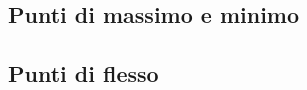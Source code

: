 \documentclass[a4paper]{article}
\begin{document}
		\subsection{Punti di massimo e minimo}
		\subsection{Punti di flesso}
	
	
	
	
	
	
	
	
	
	
	
	
	
	
	
	
	
	
	
	
	
	
	
	
	
	
	
	
	
	
	
	
	
	
	
	
	
	
	
	
	
	
	
	
	
	
	
	
	
	
	
	
	
	
	
\end{document}
